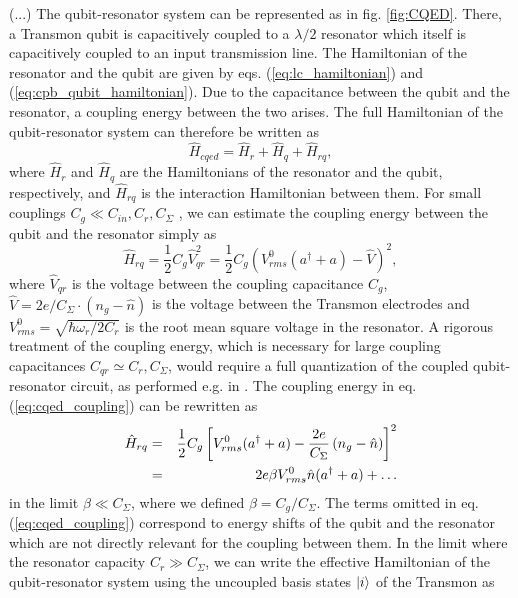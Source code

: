 (...) The qubit-resonator system can be represented as in fig. \ref{fig:CQED}. There, a Transmon qubit is capacitively coupled to a $\lambda/2$ resonator which itself is capacitively coupled to an input transmission line. The Hamiltonian of the resonator and the qubit are given by eqs. (\ref{eq:lc_hamiltonian}) and (\ref{eq:cpb_qubit_hamiltonian}). Due to the capacitance between the qubit and the resonator, a coupling energy between the two arises. The full Hamiltonian of the qubit-resonator system can therefore be written as
%
\begin{equation}
\hat{H}_{cqed} = \hat{H}_r+\hat{H}_q+\hat{H}_{rq},
\end{equation}
%
where $\hat{H}_{r}$ and $\hat{H}_q$ are the Hamiltonians of the resonator and the qubit, respectively, and $\hat{H}_{rq}$ is the interaction Hamiltonian between them. For small couplings $C_g \ll C_{in},C_r,C_\Sigma$ , we can estimate the coupling energy between the qubit and the resonator simply as
%
\begin{equation}
\hat{H}_{rq} = \frac{1}{2}C_{g}\hat{V}_{qr}^2 = \frac{1}{2}C_g\left(V^0_{rms}(a^\dagger+a)-\hat{V}\right)^2, \label{eq:cqed_coupling}
\end{equation}
%
where $\hat{V}_{qr}$ is the voltage between the coupling capacitance $C_g$, $\hat{V}=2e/C_\Sigma \cdot(n_g-\hat{n})$ is the voltage between the Transmon electrodes and $V^0_{rms} = \sqrt{\hbar \omega_r/2C_r}$ is the root mean square voltage in the resonator. A rigorous treatment of the coupling energy, which is necessary for large coupling capacitances $C_{qr}\simeq C_{r},C_\Sigma$, would require a full quantization of the coupled qubit-resonator circuit, as performed e.g. in \citep{nguyen_cooper_2008}. The coupling energy in eq. (\ref{eq:cqed_coupling}) can be rewritten as
%
\begin{eqnarray}
\hat{H}_{rq} & = & \frac{1}{2}C_g\left[V_{rms}^0(a^\dagger+a)-\frac{2e}{C_\Sigma}\left(n_g-\hat{n}\right)\right]^2 \notag \\
       & = & 2e \beta V_{rms}^0\hat{n}(a^\dagger+a) + \hdots \label{eq:cqed_coupling}
\end{eqnarray}
%
in the limit $\beta \ll C_\Sigma$, where we defined $\beta = C_g/C_\Sigma$. The terms omitted in eq. (\ref{eq:cqed_coupling}) correspond to energy shifts of the qubit and the resonator which are not directly relevant for the coupling between them. 
 In the limit where the resonator capacity $C_r \gg C_\Sigma$, we can write the effective Hamiltonian of the qubit-resonator system using the uncoupled basis states $\left| i \right>$ of the Transmon as
